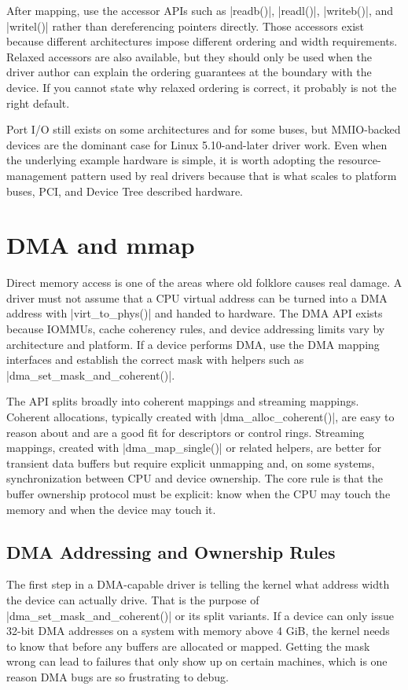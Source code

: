 \documentclass[10pt, oneside]{book}
\begin{document}
After mapping, use the accessor APIs such as \cpp|readb()|, \cpp|readl()|,
\cpp|writeb()|, and \cpp|writel()| rather than dereferencing pointers directly.
Those accessors exist because different architectures impose different ordering
and width requirements.
Relaxed accessors are also available, but they should only be used when the
driver author can explain the ordering guarantees at the boundary with the
device.
If you cannot state why relaxed ordering is correct, it probably is not the
right default.

Port I/O still exists on some architectures and for some buses, but MMIO-backed
devices are the dominant case for Linux 5.10-and-later driver work.
Even when the underlying example hardware is simple, it is worth adopting the
resource-management pattern used by real drivers because that is what scales to
platform buses, PCI, and Device Tree described hardware.

\section{DMA and mmap}
\label{sec:dma_mmap}
Direct memory access is one of the areas where old folklore causes real damage.
A driver must not assume that a CPU virtual address can be turned into a DMA
address with \cpp|virt_to_phys()| and handed to hardware.
The DMA API exists because IOMMUs, cache coherency rules, and device addressing
limits vary by architecture and platform.
If a device performs DMA, use the DMA mapping interfaces and establish the
correct mask with helpers such as \cpp|dma_set_mask_and_coherent()|.

The API splits broadly into coherent mappings and streaming mappings.
Coherent allocations, typically created with \cpp|dma_alloc_coherent()|, are
easy to reason about and are a good fit for descriptors or control rings.
Streaming mappings, created with \cpp|dma_map_single()| or related helpers, are
better for transient data buffers but require explicit unmapping and, on some
systems, synchronization between CPU and device ownership.
The core rule is that the buffer ownership protocol must be explicit: know when
the CPU may touch the memory and when the device may touch it.

\subsection{DMA Addressing and Ownership Rules}
\label{sec:dma_rules}
The first step in a DMA-capable driver is telling the kernel what address width
the device can actually drive.
That is the purpose of \cpp|dma_set_mask_and_coherent()| or its split variants.
If a device can only issue 32-bit DMA addresses on a system with memory above
4 GiB, the kernel needs to know that before any buffers are allocated or mapped.
Getting the mask wrong can lead to failures that only show up on certain
machines, which is one reason DMA bugs are so frustrating to debug.
\end{document}
